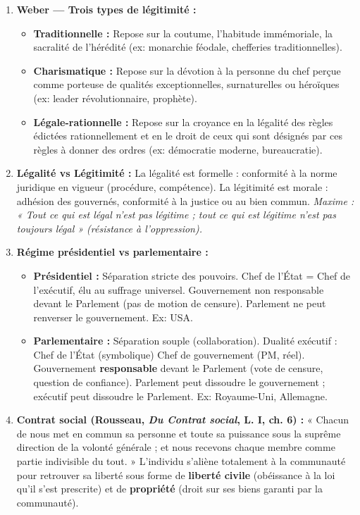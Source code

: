 \documentclass[11pt]{article}
\begin{document}
\begin{corrige}
\begin{enumerate}
\item \textbf{Weber — Trois types de légitimité :}
\begin{itemize}
\item \textbf{Traditionnelle :} Repose sur la coutume, l'habitude immémoriale, la sacralité de l'hérédité (ex: monarchie féodale, chefferies traditionnelles).
\item \textbf{Charismatique :} Repose sur la dévotion à la personne du chef perçue comme porteuse de qualités exceptionnelles, surnaturelles ou héroïques (ex: leader révolutionnaire, prophète).
\item \textbf{Légale-rationnelle :} Repose sur la croyance en la légalité des règles édictées rationnellement et en le droit de ceux qui sont désignés par ces règles à donner des ordres (ex: démocratie moderne, bureaucratie).
\end{itemize}
\item \textbf{Légalité vs Légitimité :} La légalité est formelle : conformité à la norme juridique en vigueur (procédure, compétence). La légitimité est morale : adhésion des gouvernés, conformité à la justice ou au bien commun. \emph{Maxime : « Tout ce qui est légal n'est pas légitime ; tout ce qui est légitime n'est pas toujours légal » (résistance à l'oppression).}
\item \textbf{Régime présidentiel vs parlementaire :}
\begin{itemize}
\item \textbf{Présidentiel :} Séparation stricte des pouvoirs. Chef de l'État = Chef de l'exécutif, élu au suffrage universel. Gouvernement non responsable devant le Parlement (pas de motion de censure). Parlement ne peut renverser le gouvernement. Ex: USA.
\item \textbf{Parlementaire :} Séparation souple (collaboration). Dualité exécutif : Chef de l'État (symbolique) \neq Chef de gouvernement (PM, réel). Gouvernement \textbf{responsable} devant le Parlement (vote de censure, question de confiance). Parlement peut dissoudre le gouvernement ; exécutif peut dissoudre le Parlement. Ex: Royaume-Uni, Allemagne.
\end{itemize}
\item \textbf{Contrat social (Rousseau, \emph{Du Contrat social}, L. I, ch. 6) :} « Chacun de nous met en commun sa personne et toute sa puissance sous la suprême direction de la volonté générale ; et nous recevons chaque membre comme partie indivisible du tout. » L'individu s'aliène totalement à la communauté pour retrouver sa liberté sous forme de \textbf{liberté civile} (obéissance à la loi qu'il s'est prescrite) et de \textbf{propriété} (droit sur ses biens garanti par la communauté).
\end{enumerate}
\end{corrige}
\end{document}
